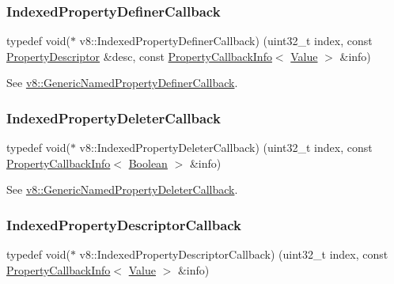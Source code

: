 \subsubsection{\texorpdfstring{Indexed\+Property\+Definer\+Callback}{IndexedPropertyDefinerCallback}}
{\footnotesize\ttfamily typedef void($\ast$ v8\+::\+Indexed\+Property\+Definer\+Callback) (uint32\+\_\+t index, const \mbox{\hyperlink{classv8_1_1PropertyDescriptor}{Property\+Descriptor}} \&desc, const \mbox{\hyperlink{classv8_1_1PropertyCallbackInfo}{Property\+Callback\+Info}}$<$ \mbox{\hyperlink{classv8_1_1Value}{Value}} $>$ \&info)}

See {\ttfamily \mbox{\hyperlink{namespacev8_a66c854bc88d612ab4c65354bc0dc74a0}{v8\+::\+Generic\+Named\+Property\+Definer\+Callback}}}. \mbox{\label{namespacev8_a53863728de14cde48dd6543207b2f2da}} 
\subsubsection{\texorpdfstring{Indexed\+Property\+Deleter\+Callback}{IndexedPropertyDeleterCallback}}
{\footnotesize\ttfamily typedef void($\ast$ v8\+::\+Indexed\+Property\+Deleter\+Callback) (uint32\+\_\+t index, const \mbox{\hyperlink{classv8_1_1PropertyCallbackInfo}{Property\+Callback\+Info}}$<$ \mbox{\hyperlink{classv8_1_1Boolean}{Boolean}} $>$ \&info)}

See {\ttfamily \mbox{\hyperlink{namespacev8_ad2aecc0406ea4bc02d5a4f84a433b273}{v8\+::\+Generic\+Named\+Property\+Deleter\+Callback}}}. \mbox{\label{namespacev8_a7506e91d70d885b5cbeabdf870ac0e88}} 
\subsubsection{\texorpdfstring{Indexed\+Property\+Descriptor\+Callback}{IndexedPropertyDescriptorCallback}}
{\footnotesize\ttfamily typedef void($\ast$ v8\+::\+Indexed\+Property\+Descriptor\+Callback) (uint32\+\_\+t index, const \mbox{\hyperlink{classv8_1_1PropertyCallbackInfo}{Property\+Callback\+Info}}$<$ \mbox{\hyperlink{classv8_1_1Value}{Value}} $>$ \&info)}

